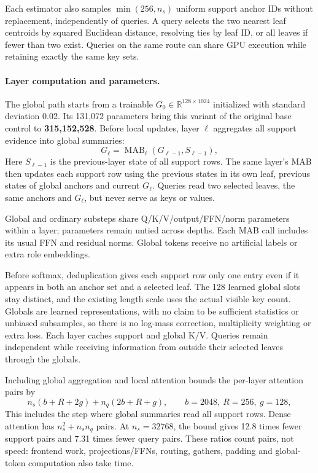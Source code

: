 \documentclass[11pt]{article}
\begin{document}
Each estimator also samples $\min(256,n_s)$ uniform support anchor IDs without replacement, independently of queries. A query selects the two nearest leaf centroids by squared Euclidean distance, resolving ties by leaf ID, or all leaves if fewer than two exist. Queries on the same route can share GPU execution while retaining exactly the same key sets.

\paragraph{Layer computation and parameters.}
The global path starts from a trainable $G_0\in\mathbb R^{128\times1024}$ initialized with standard deviation 0.02. Its 131,072 parameters bring this variant of the original base control to \textbf{315,152,528}. Before local updates, layer $\ell$ aggregates all support evidence into global summaries:
\[
G_\ell=\operatorname{MAB}_\ell(G_{\ell-1},S_{\ell-1}),
\]
Here $S_{\ell-1}$ is the previous-layer state of all support rows. The same layer's MAB then updates each support row using the previous states in its own leaf, previous states of global anchors and current $G_\ell$. Queries read two selected leaves, the same anchors and $G_\ell$, but never serve as keys or values.

Global and ordinary substeps share Q/K/V/output/FFN/norm parameters within a layer; parameters remain untied across depths. Each MAB call includes its usual FFN and residual norms. Global tokens receive no artificial labels or extra role embeddings.

Before softmax, deduplication gives each support row only one entry even if it appears in both an anchor set and a selected leaf. The 128 learned global slots stay distinct, and the existing length scale uses the actual visible key count. Globals are learned representations, with no claim to be sufficient statistics or unbiased subsamples, so there is no log-mass correction, multiplicity weighting or extra loss. Each layer caches support and global K/V. Queries remain independent while receiving information from outside their selected leaves through the globals.

Including global aggregation and local attention bounds the per-layer attention pairs by
\[
n_s(b+R+2g)+n_q(2b+R+g),\qquad b=2048,\ R=256,\ g=128,
\]
This includes the step where global summaries read all support rows. Dense attention has $n_s^2+n_sn_q$ pairs. At $n_s=32768$, the bound gives 12.8 times fewer support pairs and 7.31 times fewer query pairs. These ratios count pairs, not speed: frontend work, projections/FFNs, routing, gathers, padding and global-token computation also take time.
\end{document}
